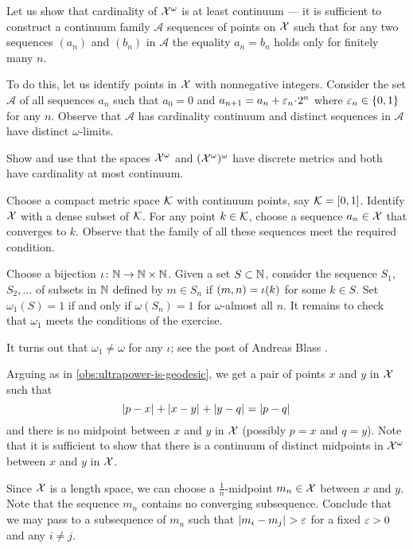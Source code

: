 Let us show that cardinality of $\mathcal{X}^\omega$ is at least continuum ---
it is sufficient to construct a continuum family $\mathcal{A}$ sequences of points on $\mathcal{X}$ such that for any two sequences $(a_n)$ and $(b_n)$ in $\mathcal{A}$ the equality $a_n=b_n$ holds only for finitely many $n$.

To do this, let us identify points in $\mathcal{X}$ with nonnegative integers.
Consider the set $\mathcal{A}$ of all sequences $a_n$ such that $a_0=0$ and $a_{n+1}\z=a_n+\eps_n\cdot 2^n$ where $\varepsilon_n\in\{0,1\}$ for any $n$.
Observe that $\mathcal{A}$ has cardinality continuum and distinct sequences in $\mathcal{A}$ have distinct $\omega$-limits.

Show and use that the spaces $\mathcal{X}^\omega$ and $(\mathcal{X}^\omega)^\omega$ have discrete metrics and both have cardinality at most continuum.

Choose a compact metric space $\mathcal{K}$ with continuum points, say $\mathcal{K}=[0,1]$.
Identify $\mathcal{X}$ with a dense subset of $\mathcal{K}$.
For any point $k\in \mathcal{K}$, choose a sequence $a_n\in \mathcal{X}$ that converges to $k$.
Observe that the family of all these sequences meet the required condition.


Choose a bijection $\iota\colon\mathbb{N}\to \mathbb{N}\times \mathbb{N}$.
Given a set $S\subset \mathbb{N}$, consider the sequence $S_1$, $S_2,\dots$ of subsets in $\mathbb{N}$ defined by $m\in S_n$ if $(m,n)\z=\iota(k)$ for some $k\in S$.
Set $\omega_1(S)=1$ if and only if $\omega(S_n)=1$ for $\omega$-almost all $n$.
It remains to check that $\omega_1$ meets the conditions of the exercise.

It turns out that $\omega_1\ne \omega$ for any $\iota$;
see the post of Andreas Blass \cite{blass}.

Arguing as in \ref{obs:ultrapower-is-geodesic}, we get a pair of points $x$ and $y$ in $\mathcal{X}$ such that
\[\dist{p}{x}{}+\dist{x}{y}{}+\dist{y}{q}{}=\dist{p}{q}{}\]
and there is no midpoint between $x$ and $y$ in $\mathcal{X}$
(possibly $p=x$ and $q=y$).
Note that it is sufficient to show that there is a continuum of distinct midpoints in $\mathcal{X}^\omega$ between $x$ and $y$ in $\mathcal{X}$.

Since $\mathcal{X}$ is a length space, we can choose a $\tfrac1n$-midpoint $m_n\in\mathcal{X}$ between $x$ and $y$.
Note that the sequence $m_n$ contains no converging subsequence.
Conclude that we may pass to a subsequence of $m_n$ such that $\dist{m_i}{m_j}{}>\eps$ for a fixed $\varepsilon>0$ and any $i\ne j$.

